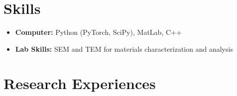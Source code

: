 \documentclass[10pt, a4paper]{article}
\begin{document}
\section{Skills}

\begin{itemize}[leftmargin=*]
    \item \textbf{Computer:} Python (PyTorch, SciPy), MatLab, C++
    \item \textbf{Lab Skills:} SEM and TEM for materials characterization and analysis
\end{itemize}


\section{Research Experiences}
\end{document}
